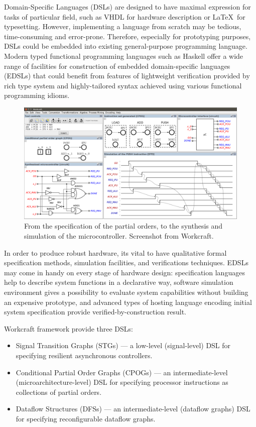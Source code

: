 \documentclass[conference]{IEEEtran}
\begin{document}
Domain-Specific Languages (DSLs) are designed to have maximal expression for
tasks of particular field, such as VHDL for hardware description or \LaTeX~for
typesetting. However, implementing a language from scratch may be tedious,
time-consuming and error-prone. Therefore, especially for prototyping purposes,
DSLs could be embedded into existing general-purpose programming language.
Modern typed functional programming languages such as Haskell offer a wide range
of facilities for construction of embedded domain-specific languages (EDSLs)
that could benefit from features of lightweight verification provided by rich
type system and highly-tailored syntax achieved using various functional
programming idioms.

\begin{figure}[ht!]
\begin{center}
    \includegraphics[width=\linewidth]{FIG/screen.png}
    \caption{From the specification of the partial orders, to the synthesis and simulation
    of the microcontroller. Screenshot from Workcraft.}
    \label{fig:screenshot}
\end{center}
\end{figure}

In order to produce robust hardware, its vital to have qualitative formal
specification methods, simulation facilities, and verifications techniques.
EDSLs may come in handy on every stage of hardware design: specification
languages help to describe system functions in a declarative way, software
simulation environment gives a possibility to evaluate system capabilities
without building an expensive prototype, and advanced types of hosting language
encoding initial system specification provide verified-by-construction result.

Workcraft framework provide three DSLs:

\begin{itemize}
\item Signal Transition Graphs (STGs) --- a low-level (signal-level) DSL for
specifying resilient asynchronous controllers.
\item Conditional Partial Order Graphs (CPOGs) --- an intermediate-level
(microarchitecture-level) DSL for specifying processor instructions as
collections of partial orders.
\item Dataflow Structures (DFSs) --- an intermediate-level (dataflow graphs) DSL
for specifying reconfigurable dataflow graphs.
\end{itemize}
\end{document}
